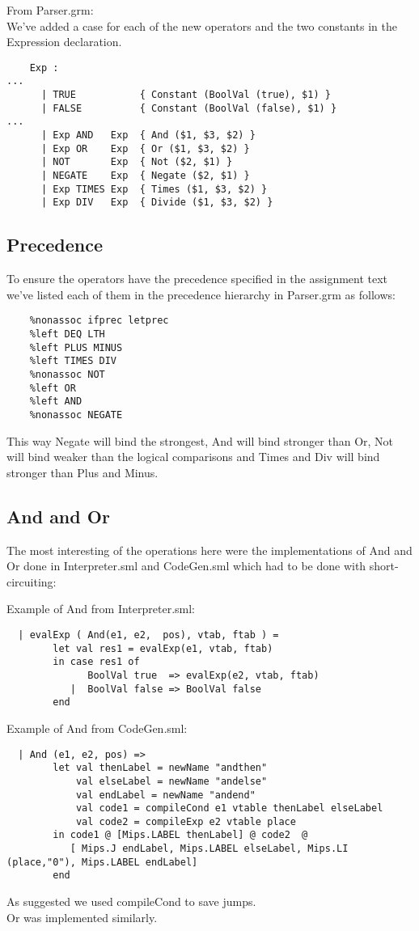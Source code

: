 \documentclass{article}
\begin{document}
From Parser.grm:\\
\noindent We've added a case for each of the new operators and the two constants in the Expression declaration.
\begin{lstlisting}
    Exp :
...
      | TRUE           { Constant (BoolVal (true), $1) }
      | FALSE          { Constant (BoolVal (false), $1) }
...
      | Exp AND   Exp  { And ($1, $3, $2) }
      | Exp OR    Exp  { Or ($1, $3, $2) }
      | NOT       Exp  { Not ($2, $1) }
      | NEGATE    Exp  { Negate ($2, $1) }
      | Exp TIMES Exp  { Times ($1, $3, $2) }
      | Exp DIV   Exp  { Divide ($1, $3, $2) }
\end{lstlisting}

\subsection{Precedence}
To ensure the operators have the precedence specified in the assignment text we've listed each of them in the precedence hierarchy in Parser.grm as follows: 
\begin{lstlisting}
    %nonassoc ifprec letprec
    %left DEQ LTH
    %left PLUS MINUS
    %left TIMES DIV
    %nonassoc NOT
    %left OR
    %left AND
    %nonassoc NEGATE
\end{lstlisting}
This way Negate will bind the strongest, And will bind stronger than Or, Not will bind weaker than the logical comparisons and Times and Div will bind stronger than Plus and Minus.

\subsection{And and Or}
The most interesting of the operations here were the implementations of And and Or done in Interpreter.sml and CodeGen.sml
which had to be done with short-circuiting:

\noindent Example of And from Interpreter.sml:
\begin{lstlisting}
  | evalExp ( And(e1, e2,  pos), vtab, ftab ) =
        let val res1 = evalExp(e1, vtab, ftab)
        in case res1 of
              BoolVal true  => evalExp(e2, vtab, ftab)
           |  BoolVal false => BoolVal false
        end
\end{lstlisting}

\noindent Example of And from CodeGen.sml:
\begin{lstlisting}
  | And (e1, e2, pos) =>
        let val thenLabel = newName "andthen"
            val elseLabel = newName "andelse"
            val endLabel = newName "andend"
            val code1 = compileCond e1 vtable thenLabel elseLabel
            val code2 = compileExp e2 vtable place
        in code1 @ [Mips.LABEL thenLabel] @ code2  @
           [ Mips.J endLabel, Mips.LABEL elseLabel, Mips.LI (place,"0"), Mips.LABEL endLabel]
        end
\end{lstlisting}
\noindent As suggested we used compileCond to save jumps.
\\
Or was implemented similarly.
\end{document}
